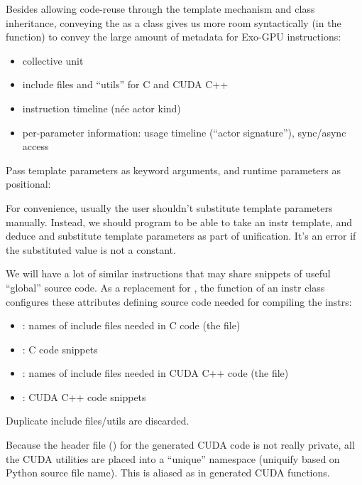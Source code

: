 \filbreak
Besides allowing code-reuse through the template mechanism and class inheritance, conveying the  as a class gives us more room syntactically (in the  function) to convey the large amount of metadata for Exo-GPU instructions:
\begin{itemize}
  \item collective unit
  \filbreak
  \item include files and ``utils'' for C and CUDA C++
  \filbreak
  \item instruction timeline (n\'ee actor kind)
  \filbreak
  \item per-parameter information: usage timeline (``actor signature''), sync/async access
\end{itemize}

\filbreak
{}

Pass template parameters as keyword arguments, and runtime parameters as positional:



\filbreak
{}

For convenience, usually the user shouldn't substitute template parameters manually.
Instead, we should program  to be able to take an instr template, and deduce and substitute template parameters as part of unification.
It's an error if the substituted value is not a constant.

\filbreak
{}

We will have a lot of similar instructions that may share snippets of useful ``global'' source code.
As a replacement for , the  function of an instr class configures these attributes defining source code needed for compiling the instrs:
\begin{itemize}
\item {}: names of include files needed in C code (the  file)
\item {}: C code snippets
\item {}: names of include files needed in CUDA C++ code (the  file)
\item {}: CUDA C++ code snippets
\end{itemize}
Duplicate include files/utils are discarded.

\filbreak
Because the header file () for the generated CUDA code is not really private, all the CUDA utilities are placed into a ``unique'' namespace (uniquify based on Python source file name).
This is aliased as  in generated CUDA functions.

